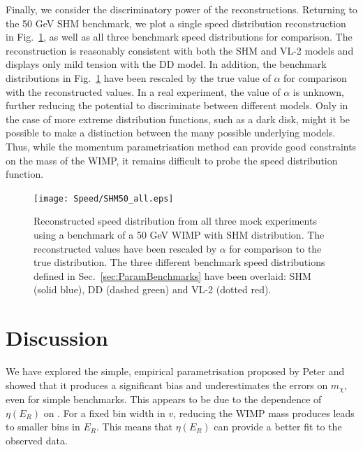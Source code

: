 Finally, we consider the discriminatory power of the reconstructions. Returning to the 50 GeV SHM benchmark, we plot a single speed distribution reconstruction in Fig.\ \ref{fig:Speed:SHM50_all}, as well as all three benchmark speed distributions for comparison. The reconstruction is reasonably consistent with both the SHM and VL-2 models and displays only mild tension with the DD model. In addition, the benchmark distributions in Fig.\ \ref{fig:Speed:SHM50_all} have been rescaled by the true value of \(\alpha\) for comparison with the reconstructed values. In a real experiment, the value of \(\alpha\) is unknown, further reducing the potential to discriminate between different models. Only in the case of more extreme distribution functions, such as a dark disk, might it be possible to make a distinction between the many possible underlying models. Thus, while the momentum parametrisation method can provide good constraints on the mass of the WIMP, it remains difficult to probe the speed distribution function.

 \begin{figure}[t]
\centering
\texttt{[image: Speed/SHM50\_all.eps]}
\caption[Reconstructed speed distribution from all three mock experiments for a 50 GeV WIMP with SHM distribution. All three benchmark distributions are shown for comparison.]{Reconstructed speed distribution from all three mock experiments using a benchmark of a 50 GeV WIMP with SHM distribution. The reconstructed values have been rescaled by \(\alpha\) for comparison to the true distribution. The three different benchmark speed distributions defined in Sec.\ \ref{sec:ParamBenchmarks} have been overlaid: SHM (solid blue), DD (dashed green) and VL-2 (dotted red).}
  \label{fig:Speed:SHM50_all}
\end{figure}



\section{Discussion}

We have explored the simple, empirical parametrisation proposed by Peter and showed that it produces a significant bias and underestimates the errors on $m_\chi$, even for simple benchmarks.  This appears to be due to the dependence of $\eta(E_R)$ on \mchi. For a fixed bin width in $v$, reducing the WIMP mass produces leads to smaller bins in $E_R$. This means that $\eta(E_R)$ can provide a better fit to the observed data.

